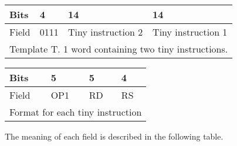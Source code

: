 \documentclass[forwardcom.tex]{subfiles}
\begin{document}
\begin{longtable}[l]{|p{8mm}|p{8mm}|p{40mm}|p{40mm}|}
\endfirsthead
\label{table:templateT}
\endhead
\hline
 Bits & 4 & \hspace{16mm} 14 & \hspace{16mm} 14 \\
\hline
Field & 0111 & \hspace{5mm} Tiny instruction 2 & \hspace{5mm} Tiny instruction 1 \\
\hline
\multicolumn{4}{|p{108mm}|}{
Template T. 1 word containing two tiny instructions.} \\
\hline
\end{longtable}

\begin{longtable}[l]{|p{10mm}|p{15mm}|p{15mm}|p{15mm}|}
\endfirsthead
\label{table:tinyFormat}
\endhead
\hline
Bits & 5 & 5 & 4 \\
\hline
Field & OP1 & RD & RS \\
\hline
\multicolumn{4}{|l|}{
Format for each tiny instruction } \\
\hline
\end{longtable}
\vspace{2mm}


The meaning of each field is described in the following table.
\end{document}

